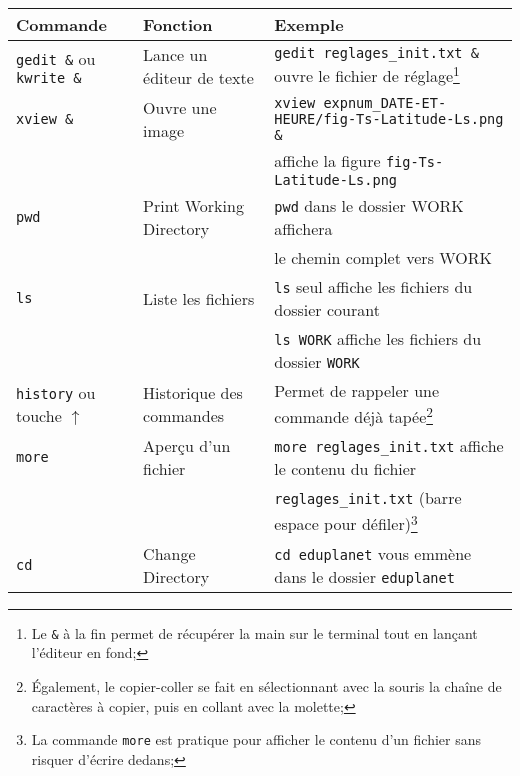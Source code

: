 \documentclass[a4paper,10pt]{article}
\begin{document}
\begin{savenotes}
\begin{table}[h!]
\centering
\begin{tabular}{lll}
Commande & Fonction & Exemple \\ \hline
\texttt{gedit \&} ou \texttt{kwrite \&} & Lance un éditeur de texte
& \texttt{gedit reglages\_init.txt \&} ouvre le fichier de
réglage\footnote{Le \texttt{\&} à la fin permet de récupérer la main sur le
terminal tout en lançant l'éditeur en fond;} \\
\texttt{xview \&} & Ouvre une image &
\texttt{xview expnum\-\_DATE\--ET\--HEURE/fig-Ts-Latitude-Ls.png \&} \\
& & affiche la figure \texttt{fig-Ts-Latitude-Ls.png} \\
\texttt{pwd} & Print Working Directory & \texttt{pwd} dans le dossier
WORK affichera \\
& & le chemin complet vers WORK \\
\texttt{ls} & Liste les fichiers & \texttt{ls} seul affiche les
fichiers du dossier courant \\
& & \texttt{ls WORK} affiche les fichiers du dossier \texttt{WORK} \\
\texttt{history} ou touche $\uparrow$ & Historique des commandes &
Permet de rappeler une commande déjà tapée\footnote{\'Egalement,
le copier-coller se fait en sélectionnant avec la souris la chaîne de
caractères à copier, puis en collant avec la molette;} \\
\texttt{more} & Aperçu d'un fichier & \texttt{more reglages\_init.txt}
affiche le contenu du fichier \\
& & \texttt{reglages\_init.txt} (barre espace pour défiler)\footnote{La
commande \texttt{more} est pratique pour afficher le contenu d'un fichier sans
risquer d'écrire dedans;} \\
\texttt{cd} & Change Directory & \texttt{cd eduplanet} vous emmène dans
le dossier \texttt{eduplanet} \\

\end{tabular}
\end{table}
\end{savenotes}
\end{document}
